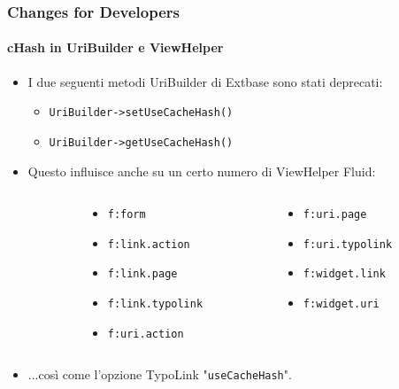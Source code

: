\begin{frame}[fragile]
	\frametitle{Changes for Developers}
	\framesubtitle{cHash in UriBuilder e ViewHelper}

	\lstset{basicstyle=\smaller\ttfamily}

	\begin{itemize}
		\item I due seguenti metodi UriBuilder di Extbase sono stati deprecati:

			\begin{itemize}
				\item \texttt{UriBuilder->setUseCacheHash()}
				\item \texttt{UriBuilder->getUseCacheHash()}
			\end{itemize}

		\item Questo influisce anche su un certo numero di ViewHelper Fluid:
	\end{itemize}
	\vspace{-0.4cm}
	\begin{columns}[T]
		\begin{column}{.05\textwidth}
		\end{column}
		\begin{column}{.45\textwidth}
			\begin{itemize}\smaller
				\item \texttt{f:form}
				\item \texttt{f:link.action}
				\item \texttt{f:link.page}
				\item \texttt{f:link.typolink}
				\item \texttt{f:uri.action}
			\end{itemize}\normalsize
		\end{column}
		\begin{column}{.45\textwidth}
			\begin{itemize}\smaller
				\item \texttt{f:uri.page}
				\item \texttt{f:uri.typolink}
				\item \texttt{f:widget.link}
				\item \texttt{f:widget.uri}
			\end{itemize}\normalsize
		\end{column}
	\end{columns}
	\vspace{0.2cm}
	\begin{itemize}
		\item ...così come l'opzione TypoLink "\texttt{useCacheHash}".
	\end{itemize}

\end{frame}

